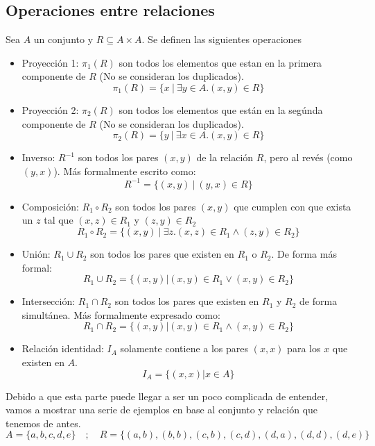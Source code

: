 \documentclass[../main.tex]{subfiles}
\begin{document}
\subsection{Operaciones entre relaciones}
Sea $A$ un conjunto y $R \subseteq A \times A$. Se definen las siguientes operaciones
\begin{itemize}
    \item Proyección 1: $\pi_1(R)$ son todos los elementos que estan en la primera componente de $R$ (No se consideran los duplicados).
    \[ \pi_1(R) = \{ x \ | \ \exists y \in A . (x,y) \in R \} \]
    \item Proyección 2: $\pi_2(R)$ son todos los elementos que están en la segúnda componente de $R$ (No se consideran los duplicados).
    \[ \pi_2(R) = \{ y \ | \ \exists x \in A . (x,y) \in R \} \]
    \item Inverso: $R^{-1}$ son todos los pares $(x,y)$ de la relación $R$, pero al revés (como $(y,x)$). Más formalmente escrito como:
    \[ R^{-1} = \{ (x,y) \ | \ (y,x) \in R \} \]
    \item Composición: $R_1 \circ R_2$ son todos los pares $(x,y)$ que cumplen con que exista un $z$ tal que $(x,z) \in R_1$ y $(z,y) \in R_2$
    \[ R_1 \circ R_2 = \{(x,y) \  | \  \exists z. (x,z) \in R_1 \wedge (z,y) \in R_2 \} \]
    \item Unión: $R_1 \cup R_2$ son todos los pares que existen en $R_1$ o $R_2$. De forma más formal:
    \[ R_1 \cup R_2 = \{ (x,y) | (x,y) \in R_1 \vee (x,y) \in R_2 \} \]
    \item Intersección: $R_1 \cap R_2$ son todos los pares que existen en $R_1$ y $R_2$ de forma simultánea. Más formalmente expresado como:
    \[ R_1 \cap R_2 = \{ (x,y) | (x,y) \in R_1 \wedge (x,y) \in R_2 \} \]
    \item Relación identidad: $I_A$ solamente contiene a los pares $(x,x)$ para los $x$ que existen en $A$.
    \[ I_A = \{ (x,x) | x \in A \} \]
\end{itemize}
Debido a que esta parte puede llegar a ser un poco complicada de entender, vamos a mostrar una serie de ejemplos en base al conjunto y relación que tenemos de antes.
\[ A = \{ a, b, c, d, e \} \quad ; \quad R = \{ (a,b), (b,b), (c,b), (c,d), (d,a), (d,d), (d,e) \} \]
\end{document}
